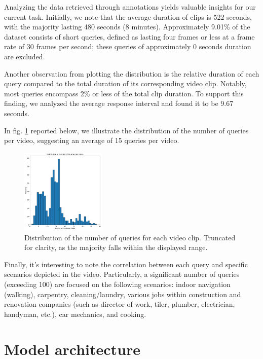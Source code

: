 \documentclass[10pt,twocolumn,letterpaper]{article}
\begin{document}
Analyzing the data retrieved through annotations yields valuable insights for our current task. Initially, we note that the average duration of clips is 522 seconds, with the majority lasting 480 seconds (8 minutes). Approximately 9.01\% of the dataset consists of short queries, defined as lasting four frames or less at a frame rate of 30 frames per second; these queries of approximately 0 seconds duration are excluded.

Another observation from plotting the distribution is the relative duration of each query compared to the total duration of its corresponding video clip. Notably, most queries encompass 2\% or less of the total clip duration. To support this finding, we analyzed the average response interval and found it to be 9.67 seconds.

In fig. \ref{fig:figure2} reported below, we illustrate the distribution of the number of queries per video, suggesting an average of 15 queries per video.

\begin{figure}[h]
\centering
\includegraphics[width=0.36\textwidth]{Figure2.pdf} %
\caption{Distribution of the number of queries for each video clip. Truncated for clarity, as the majority falls within the displayed range.}
\label{fig:figure2}
\end{figure}

Finally, it's interesting to note the correlation between each query and specific scenarios depicted in the video. Particularly, a significant number of queries (exceeding 100) are focused on the following scenarios: indoor navigation (walking), carpentry, cleaning/laundry, various jobs within construction and renovation companies (such as director of work, tiler, plumber, electrician, handyman, etc.), car mechanics, and cooking.


\section{Model architecture}
\end{document}
